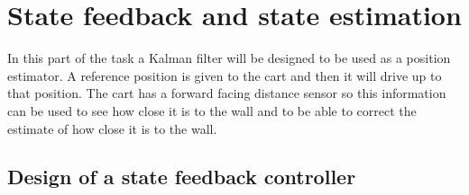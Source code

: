 \clearpage
\section{State feedback and state estimation}

In this part of the task a Kalman filter will be designed to be used as a position estimator. A reference position is given to the cart and then it will drive up to that position. The cart has a forward facing distance sensor so this information can be used to see how close it is to the wall and to be able to correct the estimate of how close it is to the wall.

\subsection{Design of a state feedback controller}

